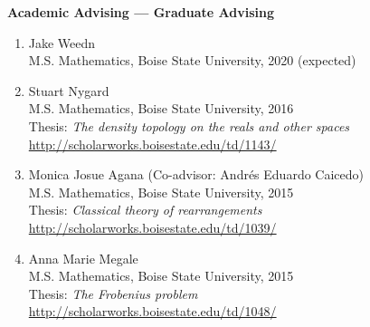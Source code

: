 \documentclass[12pt]{article}
\begin{document}
\textbf{Academic Advising --- Graduate Advising}
\begin{enumerate}

\item Jake Weedn \\
M.S. Mathematics, Boise State University, 2020 (expected)

\item
Stuart Nygard \\
M.S. Mathematics, Boise State University, 2016 \\
Thesis: \emph{The density topology on the reals and other spaces} \\
\url{http://scholarworks.boisestate.edu/td/1143/}

\item Monica Josue Agana (Co-advisor: Andr\'es Eduardo Caicedo) \\
M.S. Mathematics, Boise State University, 2015 \\
Thesis: \emph{Classical theory of rearrangements} \\
\url{http://scholarworks.boisestate.edu/td/1039/}

\item Anna Marie Megale \\
M.S. Mathematics, Boise State University, 2015 \\
Thesis: \emph{The Frobenius problem} \\
\url{http://scholarworks.boisestate.edu/td/1048/}


\end{enumerate}
\end{document}
